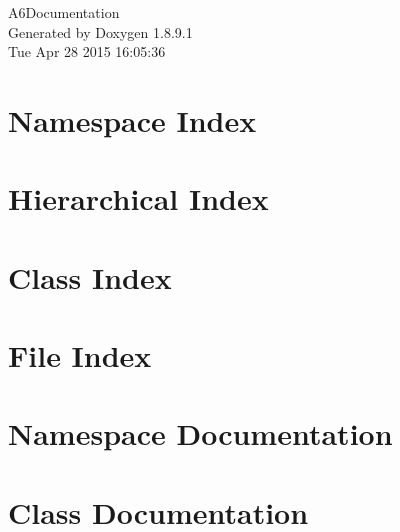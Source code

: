 \documentclass[twoside]{book}
\newcommand{\+}{\discretionary{\mbox{\scriptsize$\hookleftarrow$}}{}{}}
\newcommand{\clearemptydoublepage}{%
  \newpage{\pagestyle{empty}\cleardoublepage}%
}
\begin{document}
\hypersetup{pageanchor=false,
             bookmarks=true,
             bookmarksnumbered=true,
             pdfencoding=unicode
            }
\begin{titlepage}
\vspace*{7cm}
\begin{center}%
{\Large A6\+Documentation }\\
\vspace*{1cm}
{\large Generated by Doxygen 1.8.9.1}\\
\vspace*{0.5cm}
{\small Tue Apr 28 2015 16:05:36}\\
\end{center}
\end{titlepage}
\clearemptydoublepage
\tableofcontents
\clearemptydoublepage
{}
\hypersetup{pageanchor=true}

\chapter{Namespace Index}

\chapter{Hierarchical Index}

\chapter{Class Index}

\chapter{File Index}

\chapter{Namespace Documentation}






\chapter{Class Documentation}






















\end{document}
